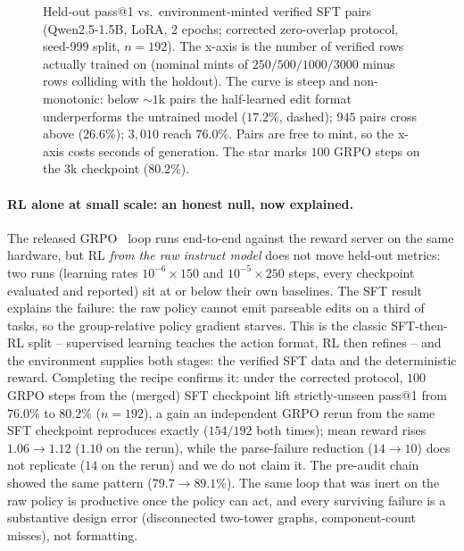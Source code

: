 \documentclass[11pt]{article}
\begin{document}
\begin{figure}[t]
\centering
{}
\caption{Held-out pass@1 vs.\ environment-minted verified SFT pairs (Qwen2.5-1.5B, LoRA, 2 epochs; corrected zero-overlap protocol, seed-999 split, $n{=}192$). The x-axis is the number of verified rows actually trained on (nominal mints of $250/500/1000/3000$ minus rows colliding with the holdout). The curve is steep and non-monotonic: below ${\sim}1$k pairs the half-learned edit format underperforms the untrained model ($17.2\%$, dashed); $945$ pairs cross above ($26.6\%$); $3{,}010$ reach $76.0\%$. Pairs are free to mint, so the x-axis costs seconds of generation. The star marks $100$ GRPO steps on the $3$k checkpoint ($80.2\%$).}
\label{fig:sftscale}
\end{figure}

\paragraph{RL alone at small scale: an honest null, now explained.} The released GRPO~\cite{grpo} loop runs end-to-end against the reward server on the same hardware, but RL \emph{from the raw instruct model} does not move held-out metrics: two runs (learning rates $10^{-6}\times150$ and $10^{-5}\times250$ steps, every checkpoint evaluated and reported) sit at or below their own baselines. The SFT result explains the failure: the raw policy cannot emit parseable edits on a third of tasks, so the group-relative policy gradient starves. This is the classic SFT-then-RL split -- supervised learning teaches the action format, RL then refines -- and the environment supplies both stages: the verified SFT data and the deterministic reward. Completing the recipe confirms it: under the corrected protocol, $100$ GRPO steps from the (merged) SFT checkpoint lift strictly-unseen pass@1 from $76.0\%$ to $\mathbf{80.2\%}$ ($n{=}192$), a gain an independent GRPO rerun from the same SFT checkpoint reproduces exactly ($154/192$ both times); mean reward rises $1.06\to1.12$ ($1.10$ on the rerun), while the parse-failure reduction ($14\to10$) does not replicate ($14$ on the rerun) and we do not claim it. The pre-audit chain showed the same pattern ($79.7\to89.1\%$). The same loop that was inert on the raw policy is productive once the policy can act, and every surviving failure is a substantive design error (disconnected two-tower graphs, component-count misses), not formatting.
\end{document}

